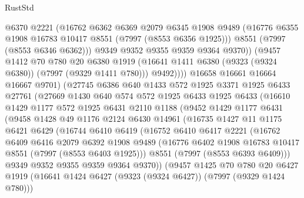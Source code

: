 \begin{lexlean}{RustStd}
\begin{coremodule}
                  @6370
                  @2221
                  (@16762
                    @6362
                    @6369
                    @2079
                    @6345
                    @1908
                    @9489
                    (@16776 @6355 @1908 @16783 @10417 @8551 (@7997 (@8553 @6356 @1925)))
                    @8551
                    (@7997 (@8553 @6346 @6362)))
                  @9349
                  @9352
                  @9355
                  @9359
                  @9364
                  @9370))
              (@9457
                @1412
                @70
                @780
                @20
                @6380
                @1919
                (@16641 @1411 @6380 (@9323 (@9324 @6380)) (@7997 (@9329 @1411 @780)))
                @9492))))
        @16658
        @16661
        @16664
        @16667
        @9701)
      (@27745
        @6386
        @640
        @1433
        @572
        @1925
        @3371
        @1925
        @6433
        @27761
        (@27669
          @1430
          @640
          @574
          @572
          @1925
          @6433
          @1925
          @6433
          (@16610
            @1429
            @1177
            @572
            @1925
            @6431
            @2110
            @1188
            (@9452
              @1429
              @1177
              @6431
              (@9458
                @1428
                @49
                @1176
                @2124
                @6430
                @14961
                (@16735
                  @1427
                  @11
                  @1175
                  @6421
                  @6429
                  (@16744
                    @6410
                    @6419
                    (@16752
                      @6410
                      @6417
                      @2221
                      (@16762
                        @6409
                        @6416
                        @2079
                        @6392
                        @1908
                        @9489
                        (@16776 @6402 @1908 @16783 @10417 @8551 (@7997 (@8553 @6403 @1925)))
                        @8551
                        (@7997 (@8553 @6393 @6409)))
                      @9349
                      @9352
                      @9355
                      @9359
                      @9364
                      @9370))
                  (@9457
                    @1425
                    @70
                    @780
                    @20
                    @6427
                    @1919
                    (@16641 @1424 @6427 (@9323 (@9324 @6427)) (@7997 (@9329 @1424 @780)))

\end{coremodule}
\end{lexlean}
